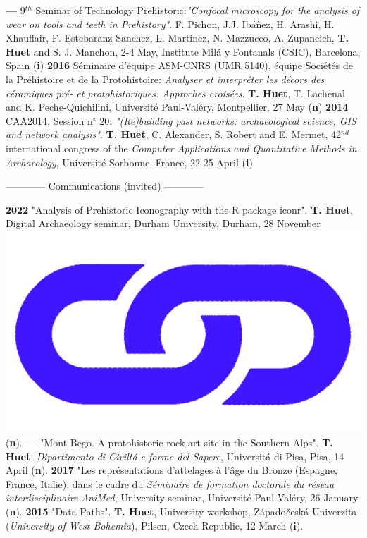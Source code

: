\documentclass{article}
\begin{document}
\smallbreak
\textbf{--- }9${}^{th}$ Seminar of Technology Prehistoric:\textit{"Confocal microscopy for the analysis of wear on tools and teeth in Prehistory"}. F. Pichon, J.J. Ibáñez, H. Arashi, H. Xhauflair, F. Estebaranz-Sanchez, L. Martinez, N. Mazzucco, A. Zupancich, \textbf{T. Huet} and S. J. Manchon, 2-4 May, Institute Milá y Fontanals (CSIC), Barcelona, Spain (\textbf{i})
\smallbreak
\textbf{2016 }S\'{e}minaire d'\'{e}quipe ASM-CNRS (UMR 5140), \'{e}quipe Soci\'{e}t\'{e}s de la Pr\'{e}histoire et de la Protohistoire: \textit{Analyser et interpr\'{e}ter les d\'{e}cors des c\'{e}ramiques pr\'{e}- et protohistoriques. Approches crois\'{e}es}. \textbf{T. Huet}, T. Lachenal and K. Peche-Quichilini, Universit\'{e} Paul-Val\'{e}ry, Montpellier, 27 May (\textbf{n})
\smallbreak
\textbf{2014 }CAA2014, Session n$\mathrm{{}^\circ}$ 20: \textit{"(Re)building past networks: archaeological science, GIS and network analysis"}. \textbf{T. Huet}, C. Alexander, S. Robert and E. Mermet, 42${}^{nd}$ international congress of the \textit{Computer Applications and Quantitative Methods in Archaeology}, Universit\'{e} Sorbonne, France, 22-25 April (\textbf{i})
\bigbreak

\begin{center}------------ Communications (invited) ------------\end{center}
\smallbreak

\textbf{2022 }"Analysis of Prehistoric Iconography with the R package iconr". \textbf{T. Huet}, Digital Archaeology seminar, Durham University, Durham, 28 November \href{http://shinyserver.cfs.unipi.it:3838/durham/_site/#/title-slide}{\includegraphics[scale=0.02]{link_darkblue.png}} (\textbf{n}).
\smallbreak
\textbf{--- }"Mont Bego. A protohistoric rock-art site in the Southern Alps". \textbf{T. Huet}, \textit{Dipartimento di Civilt\'{a} e forme del Sapere}, Universit\'{a} di Pisa, Pisa, 14 April (\textbf{n}).
\smallbreak
\textbf{2017 }"Les repr\'{e}sentations d'attelages \`{a} l'\^{a}ge du Bronze (Espagne, France, Italie), dans le cadre du \textit{S\'{e}minaire de formation doctorale du r\'{e}seau interdisciplinaire AniMed}, University seminar, Universit\'{e} Paul-Val\'{e}ry, 26 January (\textbf{n}).
\smallbreak
\textbf{2015 }"Data Paths". \textbf{T. Huet}, University workshop, Z\'{a}pado\v{c}esk\'{a} Univerzita (\textit{University of West Bohemia}), Pilsen, Czech Republic, 12 March (\textbf{i}).
\smallbreak
\end{document}
